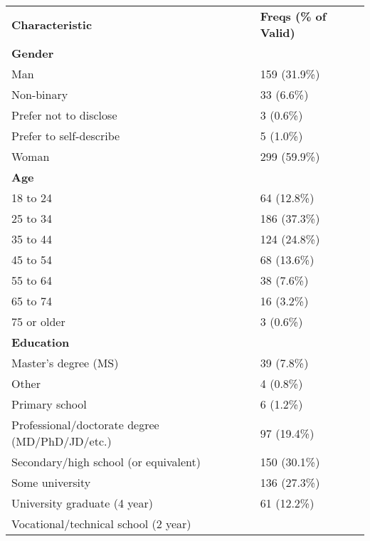 \begin{longtable}{ll}
\hline
\textbf{Characteristic} & \textbf{Freqs (\% of Valid)} \\

\textbf{Gender} & \\
\hspace{1em}Man & 159 (31.9\%) \\
\hspace{1em}Non-binary & 33 (6.6\%) \\
\hspace{1em}Prefer not to disclose & 3 (0.6\%) \\
\hspace{1em}Prefer to self-describe & 5 (1.0\%) \\
\hspace{1em}Woman & 299 (59.9\%) \\

\textbf{Age} & \\
\hspace{1em}18 to 24 & 64 (12.8\%) \\
\hspace{1em}25 to 34 & 186 (37.3\%) \\
\hspace{1em}35 to 44 & 124 (24.8\%) \\
\hspace{1em}45 to 54 & 68 (13.6\%) \\
\hspace{1em}55 to 64 & 38 (7.6\%) \\
\hspace{1em}65 to 74 & 16 (3.2\%) \\
\hspace{1em}75 or older & 3 (0.6\%) \\

\textbf{Education} & \\
\hspace{1em}Master's degree (MS) & 39 (7.8\%) \\
\hspace{1em}Other & 4 (0.8\%) \\
\hspace{1em}Primary school & 6 (1.2\%) \\
\hspace{1em}Professional/doctorate degree (MD/PhD/JD/etc.) & 97 (19.4\%) \\
\hspace{1em}Secondary/high school (or equivalent) & 150 (30.1\%) \\
\hspace{1em}Some university & 136 (27.3\%) \\
\hspace{1em}University graduate (4 year) & 61 (12.2\%) \\
\hspace{1em}Vocational/technical school (2 year) & \\


\end{longtable}
